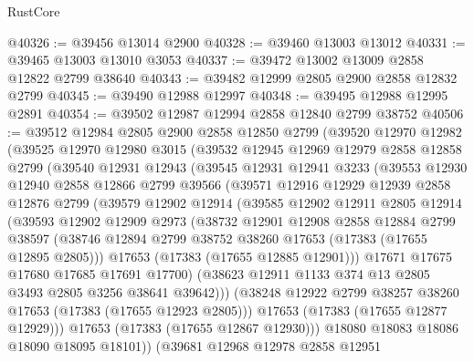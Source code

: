 \begin{lexlean}{RustCore}
\begin{coremodule}
@40326 := @39456 @13014 @2900
@40328 := @39460 @13003 @13012
@40331 := @39465 @13003 @13010 @3053
@40337 := @39472 @13002 @13009 @2858 @12822 @2799 @38640
@40343 := @39482 @12999 @2805 @2900 @2858 @12832 @2799
@40345 := @39490 @12988 @12997
@40348 := @39495 @12988 @12995 @2891
@40354 := @39502 @12987 @12994 @2858 @12840 @2799 @38752
@40506 := @39512
    @12984
    @2805
    @2900
    @2858
    @12850
    @2799
    (@39520
      @12970
      @12982
      (@39525
        @12970
        @12980
        @3015
        (@39532
          @12945
          @12969
          @12979
          @2858
          @12858
          @2799
          (@39540
            @12931
            @12943
            (@39545
              @12931
              @12941
              @3233
              (@39553
                @12930
                @12940
                @2858
                @12866
                @2799
                @39566
                (@39571
                  @12916
                  @12929
                  @12939
                  @2858
                  @12876
                  @2799
                  (@39579
                    @12902
                    @12914
                    (@39585
                      @12902
                      @12911
                      @2805
                      @12914
                      (@39593
                        @12902
                        @12909
                        @2973
                        (@38732
                          @12901
                          @12908
                          @2858
                          @12884
                          @2799
                          @38597
                          (@38746 @12894 @2799 @38752 @38260 @17653 (@17383 (@17655 @12895 @2805)))
                          @17653
                          (@17383 (@17655 @12885 @12901)))
                        @17671
                        @17675
                        @17680
                        @17685
                        @17691
                        @17700)
                      (@38623 @12911 @1133 @374 @13 @2805 @3493 @2805 @3256 @38641 @39642)))
                  (@38248 @12922 @2799 @38257 @38260 @17653 (@17383 (@17655 @12923 @2805)))
                  @17653
                  (@17383 (@17655 @12877 @12929)))
                @17653
                (@17383 (@17655 @12867 @12930)))
              @18080
              @18083
              @18086
              @18090
              @18095
              @18101))
          (@39681
            @12968
            @12978
            @2858
            @12951

\end{coremodule}
\end{lexlean}
